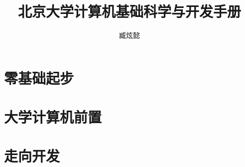\documentclass[lang=cn, color=blue, titlestyle=hang, scheme=chinese, 12pt]{elegantbook}
\title{北京大学计算机基础科学与开发手册}
\author{臧炫懿}
\institute{北京大学信息科学技术学院、北京大学学生Linux俱乐部}
\begin{document}
\maketitle

\frontmatter



\mainmatter

\tableofcontents

\part{零基础起步}









\part{大学计算机前置}









\part{走向开发}





\appendix







\backmatter


\end{document}
